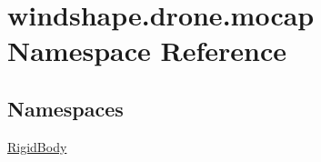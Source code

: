 \hypertarget{namespacewindshape_1_1drone_1_1mocap}{}\section{windshape.\+drone.\+mocap Namespace Reference}
\label{namespacewindshape_1_1drone_1_1mocap}
\subsection*{Namespaces}
\begin{DoxyCompactItemize}
\item 
 \mbox{\hyperlink{namespacewindshape_1_1drone_1_1mocap_1_1_rigid_body}{Rigid\+Body}}
\end{DoxyCompactItemize}

